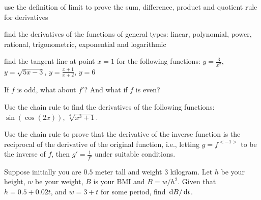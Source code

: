 \documentclass[Calculus 1 Recitation.tex]{subfiles}
\begin{document}
\begin{myleftlinebox}
	use the definition of limit to prove the sum, difference, product and quotient rule for derivatives
	\tcblower
	\vspace{3em}
\end{myleftlinebox}

\begin{myleftlinebox}
	find the derivatives of the functions of general types: linear, polynomial, power, rational, trigonometric, exponential and logarithmic
	\tcblower
	\vspace{3em}
\end{myleftlinebox}

\begin{myleftlinebox}
	find the tangent line at point $x=1$ for the following functions: $y=\frac{3}{x^2}$, $y=\sqrt{5x-3}$, $y=\frac{x+1}{x+2}$, $y=6$
	\tcblower
	\vspace{3em}
\end{myleftlinebox}

\begin{myleftlinebox}
	If $f$ is odd, what about $f'$? And what if $f$ is even?
	\tcblower
	\vspace{2em}
\end{myleftlinebox}

\begin{myleftlinebox}
	Use the chain rule to find the derivatives of the following functions: $\sin(\cos(2x))$, $\sqrt[4]{x^3+1}$.
	\tcblower
	\vspace{2em}
\end{myleftlinebox}

\begin{myleftlinebox}
	Use the chain rule to prove that the derivative of the inverse function is the reciprocal of the derivative of the original function, i.e., letting $g=f^{<-1>}$ to be the inverse of $f$, then $g'=\frac{1}{f'}$ under suitable conditions.
	\tcblower
	\vspace{2em}
\end{myleftlinebox}

\begin{myleftlinebox}
	Suppose initially you are $0.5$ meter tall and weight $3$ kilogram. Let $h$ be your height, $w$ be your weight, $B$ is your BMI and $B=w/h^2$. Given that $h=0.5+0.02t$, and $w=3+t$ for some period, find $\,\mathrm{d} B/\,\mathrm{d} t$.
	\tcblower
	\vspace{2em}
\end{myleftlinebox}
\end{document}
